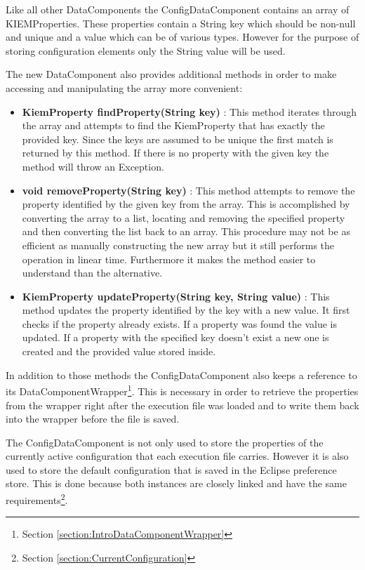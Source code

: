 Like all other DataComponents the ConfigDataComponent contains an array of
KIEMProperties. These properties contain a String key which should be non-null and unique and 
a value which can be of various types. However for the purpose of storing configuration
elements only the String value will be used.

The new DataComponent also provides additional methods in order to make accessing and manipulating the
array more convenient:
\begin{itemize}
 \item \textbf{KiemProperty findProperty(String key)} : This method iterates through the array and attempts
to find the KiemProperty that has exactly the provided key. Since the keys are assumed to be unique the first
match is returned by this method. If there is no property with the given key the method will throw
an Exception.
 \item \textbf{void removeProperty(String key)} : This method attempts to remove the property identified by
the given key from the array. This is accomplished by converting the array to a list, locating and removing the
specified property and then converting the list back to an array. This procedure may not be as efficient
as manually constructing the new array but it still performs the operation in linear time. Furthermore
it makes the method easier to understand than the alternative.
 \item \textbf{KiemProperty updateProperty(String key, String value)} : This method updates the property 
identified by the key with a new value. It first checks if the property already exists. If a property was found
the value is updated. If a property with the specified key doesn't exist a new one is created and the provided value
stored inside.
\end{itemize}

In addition to those methods the ConfigDataComponent also keeps a reference to its 
DataComponentWrapper\footnote{Section \ref{section:IntroDataComponentWrapper}}. 
This is necessary in order to retrieve the properties from the wrapper
right after the execution file was loaded and to write them back into the wrapper before the file is saved.

The ConfigDataComponent is not only used to store the properties of the currently active configuration that each
execution file carries. However it is also used to store the default configuration that is saved in the Eclipse
preference store. This is done because both instances are closely linked 
and have the same requirements\footnote{Section \ref{section:CurrentConfiguration}}.

